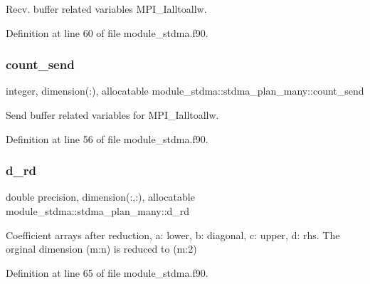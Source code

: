 Recv. buffer related variables M\+P\+I\+\_\+\+Ialltoallw. 



Definition at line 60 of file module\+\_\+stdma.\+f90.

\mbox{\label{structmodule__stdma_1_1stdma__plan__many_a4bf445309fd4740827a188160354536a}} 
\subsubsection{\texorpdfstring{count\_send}{count\_send}}
{\footnotesize\ttfamily integer, dimension(\+:), allocatable module\+\_\+stdma\+::stdma\+\_\+plan\+\_\+many\+::count\+\_\+send}



Send buffer related variables for M\+P\+I\+\_\+\+Ialltoallw. 



Definition at line 56 of file module\+\_\+stdma.\+f90.

\mbox{\label{structmodule__stdma_1_1stdma__plan__many_a4f6f40b879413975635c06e6d88c575b}} 
\subsubsection{\texorpdfstring{d\_rd}{d\_rd}}
{\footnotesize\ttfamily double precision, dimension(\+:,\+:), allocatable module\+\_\+stdma\+::stdma\+\_\+plan\+\_\+many\+::d\+\_\+rd}



Coefficient arrays after reduction, a\+: lower, b\+: diagonal, c\+: upper, d\+: rhs. The orginal dimension (m\+:n) is reduced to (m\+:2) 



Definition at line 65 of file module\+\_\+stdma.\+f90.

\mbox{\label{structmodule__stdma_1_1stdma__plan__many_a93782a813206966e7f5966baaea40710}} 
